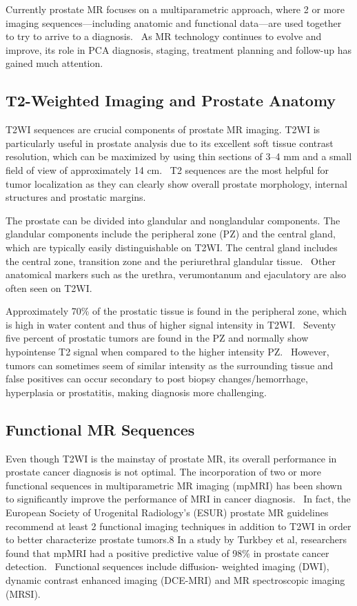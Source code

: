 Currently prostate MR focuses on a multiparametric approach, where 2 or more
imaging sequences—including anatomic and functional data—are used together to
try to arrive to a diagnosis.~\cite{Barentsz2012} As MR technology continues to evolve and
improve, its role in PCA diagnosis, staging, treatment planning and follow-up
has gained much attention.

\subsection{T2-Weighted Imaging and Prostate Anatomy}
T2WI sequences are crucial components of prostate MR imaging.  T2WI is
particularly useful in prostate analysis due to its excellent soft tissue
contrast resolution, which can be maximized by using thin sections of 3--4 mm
and a small field of view of approximately 14 cm.~\cite{Gupta2013,Bonekamp2011}
T2 sequences are the most helpful for tumor localization as they can clearly
show overall prostate morphology, internal structures and prostatic
margins.~\cite{Gupta2013}

The prostate can be divided into glandular and nonglandular components. The
glandular components include the peripheral zone (PZ) and the central gland,
which are typically easily distinguishable on T2WI. The central gland includes
the central zone, transition zone and the periurethral glandular
tissue.~\cite{Jung2012} Other anatomical markers such as the urethra,
verumontanum and ejaculatory are also often seen on T2WI. 

Approximately 70\% of the prostatic tissue is found in the peripheral zone,
which is high in water content and thus of higher signal intensity in
T2WI.~\cite{Jung2012} Seventy five percent of prostatic tumors are found in the
PZ and normally show hypointense T2 signal when compared to the higher
intensity PZ.~\cite{Hricak2007,Hegde2013} However, tumors can sometimes seem of
similar intensity as the surrounding tissue and false positives can occur
secondary to post biopsy changes/hemorrhage, hyperplasia or prostatitis, making
diagnosis more challenging.~\cite{Hegde2013}

\subsection{Functional MR Sequences}
Even though T2WI is the mainstay of prostate MR, its overall performance in
prostate cancer diagnosis is not optimal. The incorporation of two or more
functional sequences in multiparametric MR imaging (mpMRI) has been shown to
significantly improve the performance of MRI in cancer
diagnosis.~\cite{Turkbey2012} In fact, the European Society of Urogenital
Radiology’s (ESUR) prostate MR guidelines recommend at least 2 functional
imaging techniques in addition to T2WI in order to better characterize prostate
tumors.8 In a study by Turkbey et al, researchers found that mpMRI had a
positive predictive value of 98\% in prostate cancer
detection.~\cite{Turkbey2012} Functional sequences include diffusion- weighted
imaging (DWI), dynamic contrast enhanced imaging (DCE-MRI) and MR spectroscopic
imaging (MRSI). 

